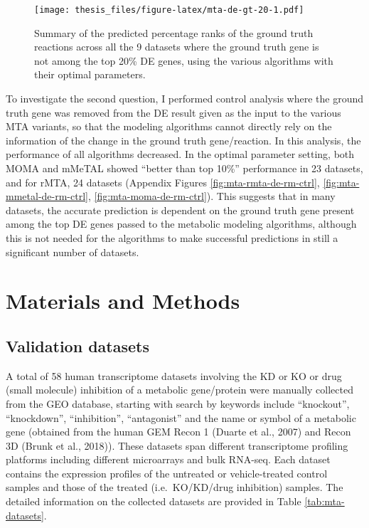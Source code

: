 \documentclass[12pt,twoside,openany,\mydriver]{thesis}  %
\begin{document}
\begin{figure}
\centering
\texttt{[image: thesis\_files/figure-latex/mta-de-gt-20-1.pdf]}
\caption{\label{fig:mta-de-gt-20}Summary of the predicted percentage ranks of the ground truth reactions across all the 9 datasets where the ground truth gene is not among the top 20\% DE genes, using the various algorithms with their optimal parameters.}
\end{figure}
To investigate the second question, I performed control analysis where the ground truth gene was removed from the DE result given as the input to the various MTA variants, so that the modeling algorithms cannot directly rely on the information of the change in the ground truth gene/reaction. In this analysis, the performance of all algorithms decreased. In the optimal parameter setting, both MOMA and mMeTAL showed ``better than top 10\%'' performance in 23 datasets, and for rMTA, 24 datasets (Appendix Figures \ref{fig:mta-rmta-de-rm-ctrl}, \ref{fig:mta-mmetal-de-rm-ctrl}, \ref{fig:mta-moma-de-rm-ctrl}). This suggests that in many datasets, the accurate prediction is dependent on the ground truth gene present among the top DE genes passed to the metabolic modeling algorithms, although this is not needed for the algorithms to make successful predictions in still a significant number of datasets.

\hypertarget{materials-and-methods}{%
\section{Materials and Methods}\label{materials-and-methods}}

\hypertarget{validation-datasets}{%
\subsection{Validation datasets}\label{validation-datasets}}

A total of 58 human transcriptome datasets involving the KD or KO or drug (small molecule) inhibition of a metabolic gene/protein were manually collected from the GEO database, starting with search by keywords include ``knockout'', ``knockdown'', ``inhibition'', ``antagonist'' and the name or symbol of a metabolic gene (obtained from the human GEM Recon 1 (Duarte et al., 2007) and Recon 3D (Brunk et al., 2018)). These datasets span different transcriptome profiling platforms including different microarrays and bulk RNA-seq. Each dataset contains the expression profiles of the untreated or vehicle-treated control samples and those of the treated (i.e.~KO/KD/drug inhibition) samples. The detailed information on the collected datasets are provided in Table \ref{tab:mta-datasets}.
\end{document}

